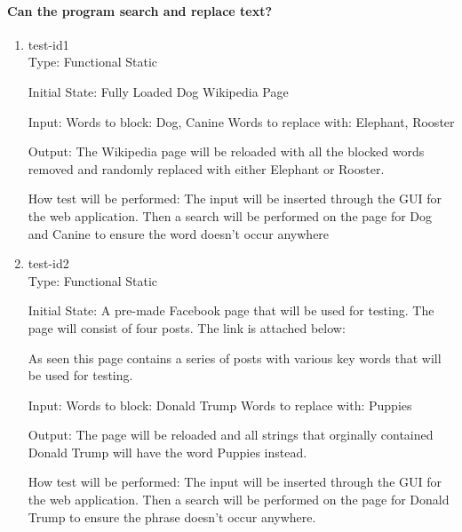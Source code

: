 \documentclass[12pt, titlepage]{article}
\begin{document}
\paragraph{Can the program search and replace text?}
\begin{enumerate}
\item{test-id1\\}
Type: Functional Static
					
Initial State: Fully Loaded Dog Wikipedia Page
					
Input: Words to block: Dog, Canine
Words to replace with: Elephant, Rooster
					
Output: The Wikipedia page will be reloaded with all the blocked words removed and randomly replaced with either Elephant or Rooster.
					
How test will be performed: The input will be inserted through the GUI for the web application. Then a search will be performed on the page for Dog and Canine to ensure the word doesn't occur anywhere
					
\item{test-id2\\}
Type: Functional Static
					
Initial State: A pre-made Facebook page that will be used for testing. The page will consist of four posts. The link is attached below:

As seen this page contains a series of posts with various key words that will be used for testing.
					
Input:  Words to block: Donald Trump
Words to replace with: Puppies
					
Output: The page will be reloaded and all strings that orginally contained Donald Trump will have the word Puppies instead. 

How test will be performed: The input will be inserted through the GUI for the web application. Then a search will be performed on the page for Donald Trump to ensure the phrase doesn't occur anywhere.
\end{enumerate}
\end{document}
